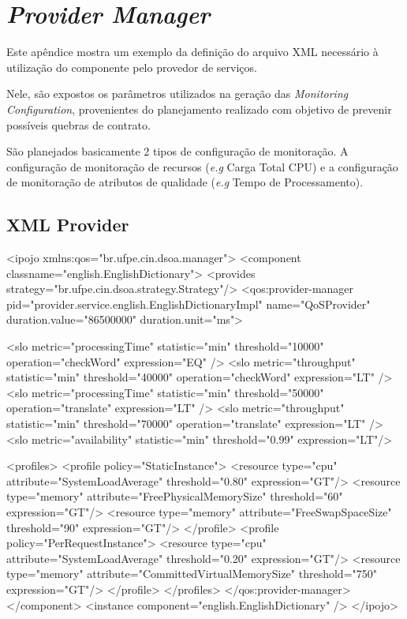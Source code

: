\chapter{\textit{Provider Manager}}

Este apêndice mostra um exemplo da definição do arquivo XML necessário à utilização do componente pelo provedor de serviços.

Nele, são expostos os parâmetros utilizados na geração das \textit{Monitoring Configuration}, provenientes do planejamento realizado com objetivo de prevenir possíveis quebras de contrato.

São planejados basicamente 2 tipos de configuração de monitoração. A configuração de monitoração de recursos (\textit{e.g} Carga Total CPU) e a configuração de monitoração de atributos de qualidade (\textit{e.g} Tempo de Processamento).

\section{XML Provider}

\tiny
\begin{verbatimtab}[4]
<ipojo xmlns:qos="br.ufpe.cin.dsoa.manager">
	<component classname="english.EnglishDictionary">
		<provides strategy="br.ufpe.cin.dsoa.strategy.Strategy"/>
		<qos:provider-manager pid="provider.service.english.EnglishDictionaryImpl" name="QoSProvider"
			duration.value="86500000" duration.unit="ms">
			
			<slo metric="processingTime" statistic="min" threshold="10000"  operation="checkWord" expression="EQ" />
			<slo metric="throughput"     statistic="min" threshold="40000"  operation="checkWord" expression="LT" />
			<slo metric="processingTime" statistic="min" threshold="50000"  operation="translate" expression="LT" />
			<slo metric="throughput"     statistic="min" threshold="70000"  operation="translate" expression="LT" />
			<slo metric="availability"   statistic="min" threshold="0.99"   expression="LT"/>
			
			<profiles>
				<profile policy="StaticInstance">
					<resource type="cpu" 	attribute="SystemLoadAverage" threshold="0.80" expression="GT"/>
					<resource type="memory" attribute="FreePhysicalMemorySize" threshold="60" expression="GT"/>
					<resource type="memory" attribute="FreeSwapSpaceSize" threshold="90" expression="GT"/>
				</profile>
				<profile policy="PerRequestInstance">
					<resource type="cpu" 	attribute="SystemLoadAverage" threshold="0.20" expression="GT"/>
					<resource type="memory" attribute="CommittedVirtualMemorySize" threshold="750" expression="GT"/>
				</profile>
			</profiles>
		</qos:provider-manager>
	</component>
	<instance component="english.EnglishDictionary" />
</ipojo>
\end{verbatimtab}

